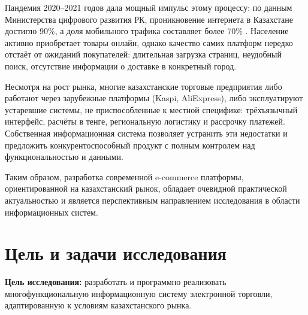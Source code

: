 \documentclass[14pt,a4paper]{extreport}
\begin{document}
Пандемия 2020--2021 годов дала мощный импульс этому процессу: по данным Министерства цифрового развития РК, проникновение интернета в Казахстане достигло 90\%, а доля мобильного трафика составляет более 70\% \cite{digital2023}. Население активно приобретает товары онлайн, однако качество самих платформ нередко отстаёт от ожиданий покупателей: длительная загрузка страниц, неудобный поиск, отсутствие информации о доставке в конкретный город.

Несмотря на рост рынка, многие казахстанские торговые предприятия либо работают через зарубежные платформы (Kaspi, AliExpress), либо эксплуатируют устаревшие системы, не приспособленные к местной специфике: трёхъязычный интерфейс, расчёты в тенге, региональную логистику и рассрочку платежей. Собственная информационная система позволяет устранить эти недостатки и предложить конкурентоспособный продукт с полным контролем над функциональностью и данными.

Таким образом, разработка современной e-commerce платформы, ориентированной на казахстанский рынок, обладает очевидной практической актуальностью и является перспективным направлением исследования в области информационных систем.

\section{Цель и задачи исследования}

\textbf{Цель исследования:} разработать и программно реализовать многофункциональную информационную систему электронной торговли, адаптированную к условиям казахстанского рынка.
\end{document}
